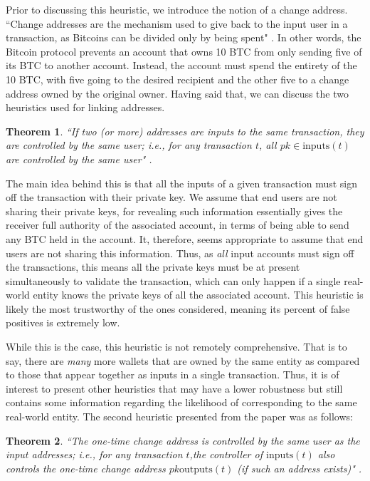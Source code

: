 \documentclass[journal]{IEEEtran}
\newtheorem{theorem}{Theorem}[section]
\begin{document}
Prior to discussing this heuristic, we introduce the notion of a change address. ``Change addresses are the mechanism used to give back to the input user in a transaction, as Bitcoins can be divided only by being spent" \cite{fistful}. In other words, the Bitcoin protocol prevents an account that owns 10 BTC from only sending five of its BTC to another account. Instead, the account must spend the entirety of the 10 BTC, with five going to the desired recipient and the other five to a change address owned by the original owner. Having said that, we can discuss the two heuristics used for linking addresses.

\begin{theorem}
``If two (or more) addresses are inputs to the same transaction, they are controlled by the same user; i.e., for any transaction $t$, all $pk\in\text{inputs}(t)$  are controlled by the same user" \cite{fistful}.
\end{theorem}

The main idea behind this is that all the inputs of a given transaction must sign off the transaction with their private key. We assume that end users are not sharing their private keys, for revealing such information essentially gives the receiver full authority of the associated account, in terms of being able to send any BTC held in the account. It, therefore, seems appropriate to assume that end users are not sharing this information. Thus, as \textit{all} input accounts must sign off the transactions, this means all the private keys must be at present simultaneously to validate the transaction, which can only happen if a single real-world entity knows the private keys of all the associated account. This heuristic is likely the most trustworthy of the ones considered, meaning its percent of false positives is extremely low. 

While this is the case, this heuristic is not remotely comprehensive. That is to say, there are \textit{many} more wallets that are owned by the same entity as compared to those that appear together as inputs in a single transaction. Thus, it is of interest to present other heuristics that may have a lower robustness but still contains some information regarding the likelihood of corresponding to the same real-world entity. The second heuristic presented from the paper was as follows:

\begin{theorem}
``The  one-time  change  address  is  controlled  by the same user as the input addresses; i.e., for any transaction $t$,the controller of $\text{inputs}(t)$ also controls the one-time change address $pk \text{outputs}(t)$ (if such an address exists)" \cite{fistful}.
\end{theorem}
\end{document}
